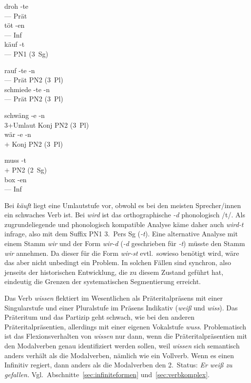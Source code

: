 \begin{exe}
\begin{xlist}
    \ex\gll droh -te\\
    --- Prät\\
    \ex\gll töt -en\\
    --- Inf\\
    \ex\gll käuf -t\\
    --- {PN1 (3~Sg)}\\
  \end{xlist}
  \ex
  \begin{xlist}
    \ex\gll rauf -te -n\\
    --- Prät {PN2 (3~Pl)}\\
    \ex\gll schmiede -te -n\\
    --- Prät {PN2 (3~Pl)}\\
  \end{xlist}
  \ex
  \begin{xlist}
    \ex\gll schwäng -e -n\\
    3+Umlaut Konj {PN2 (3~Pl)}\\
    \ex\gll wär -e -n\\
    $+$ Konj {PN2 (3~Pl)}\\
  \end{xlist}
  \ex
  \begin{xlist}
    \ex\gll muss -t\\
    $+$ {PN2 (2~Sg)}\\
    \ex\gll box -en\\
    --- Inf\\
  \end{xlist}
\end{exe}

Bei \textit{käuft} liegt eine Umlautstufe vor, obwohl es bei den meisten Sprecher\slash innen ein schwaches Verb ist.
Bei \textit{wird} ist das orthographische \textit{-d} phonologisch /t/.
Als zugrundeliegende und phonologisch kompatible Analyse käme daher auch \textit{wird-t} infrage, also mit dem Suffix PN1 3.~Pers Sg (\textit{-t}).
Eine alternative Analyse mit einem Stamm \textit{wir} und der Form \textit{wir-d} (\textit{-d} geschrieben für \textit{-t}) müsste den Stamm \textit{wir} annehmen.
Da dieser für die Form \textit{wir-st} evtl.\ sowieso benötigt wird, wäre das aber nicht unbedingt ein Problem.
In solchen Fällen sind synchron, also jenseits der historischen Entwicklung, die zu diesem Zustand geführt hat, eindeutig die Grenzen der systematischen Segmentierung erreicht.

\label{sol:verbalflexion06}

Das Verb \textit{wissen} flektiert im Wesentlichen als Präteritalpräsens mit einer Singularstufe und einer Pluralstufe im Präsens Indikativ (\textit{weiß} und \textit{wiss}).
Das Präteritum und das Partizip geht schwach, wie bei den anderen Präteritalpräsentien, allerdings mit einer eigenen Vokalstufe \textit{wuss}.
Problematisch ist das Flexionsverhalten von \textit{wissen} nur dann, wenn die Präteritalpräsentien mit den Modalverben genau identifiziert werden sollen, weil \textit{wissen} sich semantisch anders verhält als die Modalverben, nämlich wie ein Vollverb.
Wenn es einen Infinitiv regiert, dann anders als die Modalverben den 2.~Status: \textit{Er weiß zu gefallen.}
Vgl.\ Abschnitte~\ref{sec:infiniteformen} und~\ref{sec:verbkomplex}.

